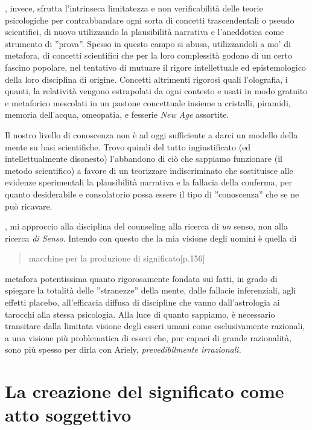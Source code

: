 , invece, sfrutta l'intrinseca limitatezza e non verificabilità delle teorie psicologiche per contrabbandare ogni sorta di concetti trascendentali o pseudo scientifici, di nuovo utilizzando la plausibilità narrativa e l'aneddotica come strumento di ''prova''. Spesso in questo campo si abusa, utilizzandoli a mo' di metafora, di concetti scientifici che per la loro complessità godono di un certo fascino popolare, nel tentativo di mutuare il rigore intellettuale ed epistemologico della loro disciplina di origine.
Concetti altrimenti rigorosi quali l'olografia, i quanti, la relatività vengono estrapolati da ogni contesto e usati in modo gratuito e metaforico mescolati in un pastone concettuale insieme a cristalli, piramidi, memoria dell'acqua, omeopatia, e fesserie \emph{New Age} assortite.

Il nostro livello di conoscenza non è ad oggi sufficiente a darci un modello della mente su basi scientifiche. Trovo quindi del tutto ingiustificato (ed intellettualmente disonesto) l'abbandono di ciò che sappiamo funzionare (il metodo scientifico) a favore di un teorizzare indiscriminato che sostituisce alle evidenze sperimentali la plausibilità narrativa e la fallacia della conferma, per quanto desiderabile e consolatorio possa essere il tipo di ''conoscenza'' che se ne può ricavare.

, mi approccio alla disciplina del counseling alla ricerca di \emph{un} senso, non alla ricerca \emph{di Senso}. Intendo con questo che la mia visione degli uomini è quella di
\begin{quote}
macchine per la produzione di significato\cite{consciousness}[p.156]
\end{quote}
metafora potentissima quanto rigorosamente fondata sui fatti, in grado di spiegare la totalità delle ''stranezze'' della mente, dalle fallacie inferenziali\cite{hb}, agli effetti placebo, all'efficacia diffusa di discipline che vanno dall'astrologia ai tarocchi alla stessa psicologia. Alla luce di quanto sappiamo, è necessario transitare dalla limitata visione degli esseri umani come esclusivamente razionali, a una visione più problematica di esseri che, pur capaci di grande razionalità, sono più spesso per dirla con Ariely, \emph{prevedibilmente irrazionali.}\cite{predirr}

\section{La creazione del significato come atto soggettivo}


